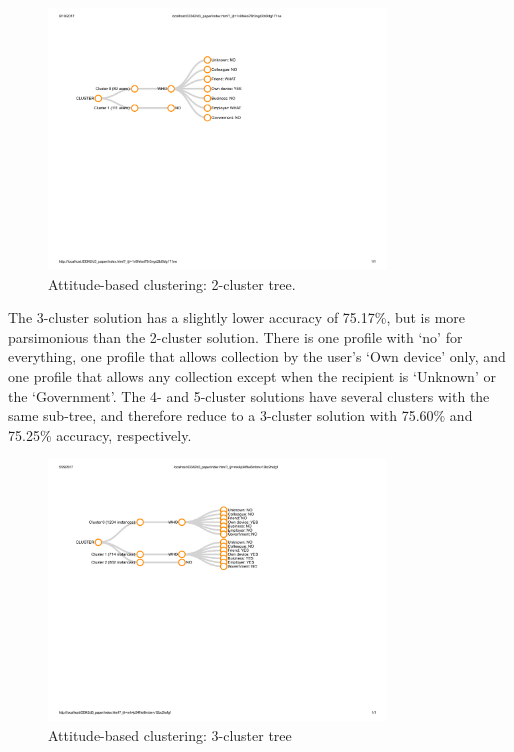 \begin{figure}
	\centering
	\includegraphics[width=0.8\textwidth]{figures/attitude-based-2.pdf}
	\caption{Attitude-based clustering: 2-cluster tree. %
	}
	\label{fig:2clusters}
\end{figure}

The 3-cluster solution has a slightly lower accuracy of 75.17\%, but is more parsimonious than the 2-cluster solution. There is one profile with `no' for everything, one profile that allows collection by the user's `Own device' only, and one profile that allows any collection except when the recipient is `Unknown' or the `Government'. The 4- and 5-cluster solutions have several clusters with the same sub-tree, and therefore reduce to a 3-cluster solution with 75.60\% and 75.25\% accuracy, respectively.


\begin{figure}
	\centering
	\includegraphics[width=0.8\textwidth]{figures/attitude-based-3.pdf}
	\caption{Attitude-based clustering: 3-cluster tree}
	\label{fig:3clusters}
\end{figure}



